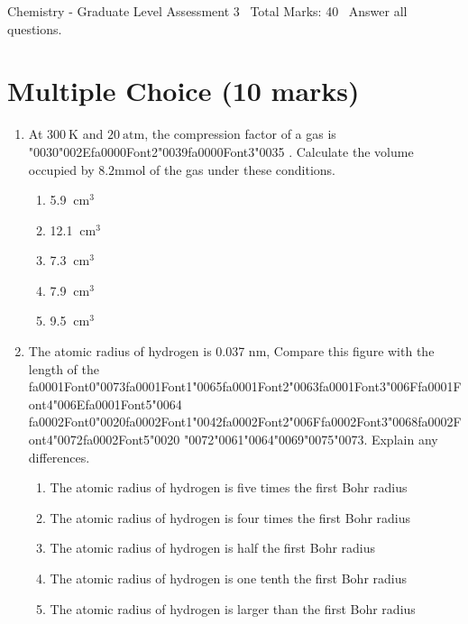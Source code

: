 \documentclass[12pt]{article}
\begin{document}
\begin{center}
Chemistry - Graduate Level Assessment 3 \
Total Marks: 40 \
Answer all questions.
\end{center}

\section*{Multiple Choice (10 marks)}
\begin{enumerate}[label=\arabic*.]
\item At $300 \mathrm{~K}$ and $20 \mathrm{~atm}$, the compression factor of a gas is {\char"0030}{\char"002E}{\csname fa0000Font2\endcsname\char"0039}{\csname fa0000Font3\endcsname\char"0035} .
Calculate the volume occupied by $8.2 \mathrm{mmol}$ of the gas under these conditions.
\begin{enumerate}[label=(\alph*)]
    \item 5.9 $\mathrm{~cm}^3$
    \item 12.1 $\mathrm{~cm}^3$
    \item 7.3 $\mathrm{~cm}^3$
    \item 7.9 $\mathrm{~cm}^3$
    \item 9.5 $\mathrm{~cm}^3$
\end{enumerate}
\item The atomic radius of hydrogen is 0.037 nm, Compare this figure with the length of the
{\csname fa0001Font0\endcsname\char"0073}{\csname fa0001Font1\endcsname\char"0065}{\csname fa0001Font2\endcsname\char"0063}{\csname fa0001Font3\endcsname\char"006F}{\csname fa0001Font4\endcsname\char"006E}{\csname fa0001Font5\endcsname\char"0064} {\csname fa0002Font0\endcsname\char"0020}{\csname fa0002Font1\endcsname\char"0042}{\csname fa0002Font2\endcsname\char"006F}{\csname fa0002Font3\endcsname\char"0068}{\csname fa0002Font4\endcsname\char"0072}{\csname fa0002Font5\endcsname\char"0020} {\char"0072}{\char"0061}{\char"0064}{\char"0069}{\char"0075}{\char"0073}. Explain any differences.
\begin{enumerate}[label=(\alph*)]
    \item The atomic radius of hydrogen is five times the first Bohr radius
    \item The atomic radius of hydrogen is four times the first Bohr radius
    \item The atomic radius of hydrogen is half the first Bohr radius
    \item The atomic radius of hydrogen is one tenth the first Bohr radius
    \item The atomic radius of hydrogen is larger than the first Bohr radius

\end{enumerate}
\end{enumerate}
\end{document}
